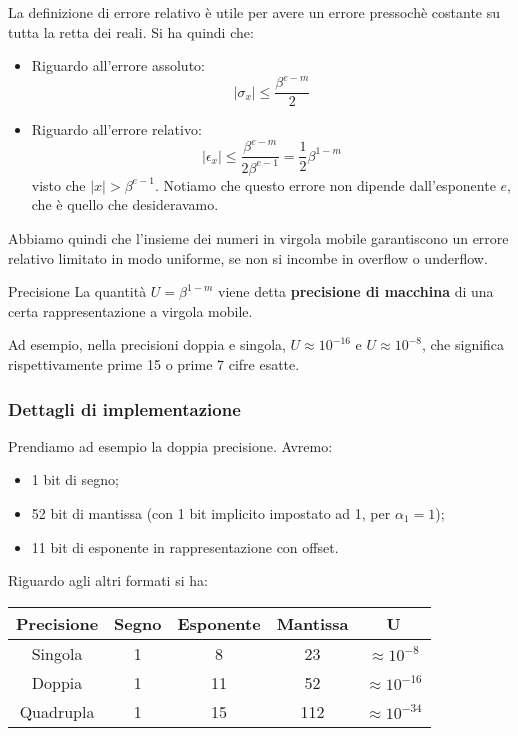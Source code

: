 \documentclass[a4paper,11pt]{article}
\begin{document}
La definizione di errore relativo è utile per avere un errore pressochè costante su tutta la retta dei reali.
Si ha quindi che:

\begin{itemize}
	\item Riguardo all'errore assoluto: $$|\sigma_x| \leq \frac{\beta^{e - m}}{2}$$
	\item Riguardo all'errore relativo: $$|\epsilon_x| \leq \frac{\beta^{e - m}}{2\beta^{e - 1}} = \frac{1}{2}\beta^{1 - m}$$ visto che $|x| > \beta^{e - 1}$. Notiamo che questo errore non dipende dall'esponente $e$, che è quello che desideravamo.
\end{itemize}

Abbiamo quindi che l'insieme dei numeri in virgola mobile garantiscono un errore relativo limitato in modo uniforme, se non si incombe in overflow o underflow.

\begin{definition}{Precisione}
	La quantità $U = \beta^{1-m}$  viene detta \textbf{precisione di macchina} di una certa rappresentazione a virgola mobile.	
\end{definition}

Ad esempio, nella precisioni doppia e singola, $U \approx 10^{-16}$ e $U \approx 10^{-8}$, che significa rispettivamente prime 15 o prime 7 cifre esatte.

\subsubsection{Dettagli di implementazione}
Prendiamo ad esempio la doppia precisione.
Avremo:
\begin{itemize}
	\item 1 bit di segno;
	\item 52 bit di mantissa (con 1 bit implicito impostato ad 1, per $\alpha_1 = 1$);
	\item 11 bit di esponente in rappresentazione con offset.
\end{itemize}

Riguardo agli altri formati si ha:

\begin{table}[h!]
	\center {}
	\begin{tabular} { c | c | c | c | c}
		\bfseries Precisione & \bfseries Segno & \bfseries Esponente & \bfseries Mantissa & \bfseries U \\ 
		\hline
		Singola & 1 & 8 & 23 & $\approx 10^{-8}$ \\
		Doppia & 1 & 11 & 52 & $\approx 10^{-16}$ \\
		Quadrupla & 1 & 15 & 112 & $\approx 10^{-34}$ \\
	\end{tabular}
\end{table}
\end{document}
